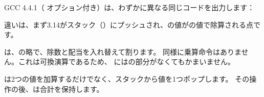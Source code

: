 ﻿

GCC 4.4.1（ \Othree オプション付き）は、わずかに異なる同じコードを出力します：



違いは、まず3.14がスタック（）にプッシュされ、の値がの値で除算される点です。


\FDIVR は、の略で、除数と配当を入れ替えて割ります。 
同様に乗算命令はありません。これは可換演算であるため、 \FMUL にはの部分がなくてもかまいません。


\FADDP は2つの値を加算するだけでなく、スタックから値を1つポップします。 
その操作の後、は合計を保持します。
